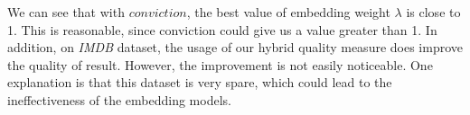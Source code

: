 We can see that with $conviction$, the best value of embedding weight $\lambda$ is close to 1. This is reasonable, since conviction could give us a value greater than 1. In addition, on \textit{IMDB} dataset, the usage of our hybrid quality measure does improve the quality of result. However, the improvement is not easily noticeable. One explanation is that this dataset is very spare, which could lead to the ineffectiveness of the embedding models.
\begin{figure}[t]
     \centering
     \\
      \\   

\end{figure}
